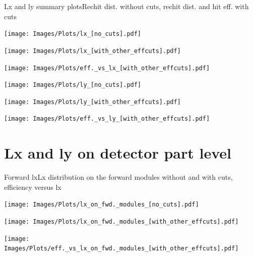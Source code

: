 \documentclass{beamer}
\begin{document}
\begin{frame}{Lx and ly summary plots}{Rechit dist. without cuts, rechit dist. and hit eff. with cuts}
  \begin{minipage}{0.32\textwidth}
    \centering
    \texttt{[image: Images/Plots/lx\_[no\_cuts].pdf]}
  \end{minipage}%
  \hspace{0.01\textwidth}%
  \begin{minipage}{0.32\textwidth}
    \centering
    \texttt{[image: Images/Plots/lx\_[with\_other\_effcuts].pdf]}
  \end{minipage}%
  \hspace{0.01\textwidth}%
  \begin{minipage}{0.32\textwidth}
    \centering
    \texttt{[image: Images/Plots/eff.\_vs\_lx\_[with\_other\_effcuts].pdf]}
  \end{minipage}
  \vspace*{0.2cm}
  \begin{minipage}{0.32\textwidth}
    \centering
    \texttt{[image: Images/Plots/ly\_[no\_cuts].pdf]}
  \end{minipage}%
  \hspace{0.01\textwidth}%
  \begin{minipage}{0.32\textwidth}
    \centering
    \texttt{[image: Images/Plots/ly\_[with\_other\_effcuts].pdf]}
  \end{minipage}%
  \hspace{0.01\textwidth}%
  \begin{minipage}{0.32\textwidth}
    \centering
    \texttt{[image: Images/Plots/eff.\_vs\_ly\_[with\_other\_effcuts].pdf]}
  \end{minipage}
\end{frame}

\section{Lx and ly on detector part level}

\begin{frame}{Forward lx}{Lx distribution on the forward modules without and with cuts, efficiency versus lx}
\begin{minipage}{0.32\textwidth}
  \centering
  \texttt{[image: Images/Plots/lx\_on\_fwd.\_modules\_[no\_cuts].pdf]}
\end{minipage}%
\hspace{0.01\textwidth}%
\begin{minipage}{0.32\textwidth}
  \centering
  \texttt{[image: Images/Plots/lx\_on\_fwd.\_modules\_[with\_other\_effcuts].pdf]}
\end{minipage}%
\hspace{0.01\textwidth}%
\begin{minipage}{0.32\textwidth}
  \centering
  \texttt{[image: Images/Plots/eff.\_vs\_lx\_on\_fwd.\_modules\_[with\_other\_effcuts].pdf]}
\end{minipage}
\end{frame}
\end{document}
